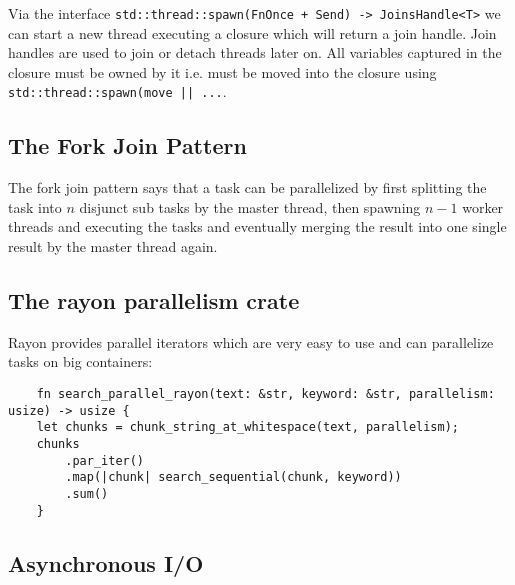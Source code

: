    Via the interface \lstinline{std::thread::spawn(FnOnce + Send) -> JoinsHandle<T>} we can start a new thread executing a closure which will return a join handle. Join handles are used to join or detach threads later on. All variables captured in the closure must be owned by it i.e. must be moved into the closure using \lstinline{std::thread::spawn(move || ...}.

    \subsection{The Fork Join Pattern}

    The fork join pattern says that a task can be parallelized by first splitting the task into $n$ disjunct sub tasks by the master thread, then spawning $n-1$ worker threads and executing the tasks and eventually merging the result into one single result by the master thread again.

\subsection{The rayon parallelism crate}

Rayon provides parallel iterators which are very easy to use and can parallelize tasks on big containers:

\begin{lstlisting}
    fn search_parallel_rayon(text: &str, keyword: &str, parallelism: usize) -> usize {
    let chunks = chunk_string_at_whitespace(text, parallelism);
    chunks
        .par_iter()
        .map(|chunk| search_sequential(chunk, keyword))
        .sum()
    }
\end{lstlisting}

\subsection{Asynchronous I/O}

